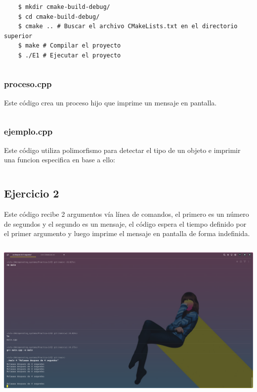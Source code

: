 \documentclass[]{article}
\newenvironment{code}{\captionsetup{type=listing}}{}
\begin{document}
\begin{verbatim}
	$ mkdir cmake-build-debug/
	$ cd cmake-build-debug/
	$ cmake .. # Buscar el archivo CMakeLists.txt en el directorio superior
	$ make # Compilar el proyecto
	$ ./E1 # Ejecutar el proyecto
\end{verbatim}

\begin{code}
	\inputminted{cmake}{../E1/CMakeLists.txt}
\end{code}

\subsubsection*{proceso.cpp}
Este código crea un proceso hijo que imprime un mensaje en pantalla.
\begin{code}
	\inputminted{c}{../E1/proceso.c}
\end{code}


\subsubsection*{ejemplo.cpp}
Este código utiliza polimorfismo para detectar el tipo de un objeto e imprimir
una funcion especifica en base a ello:
\begin{code}
	\inputminted{c}{../E1/ejemplo.cpp}
\end{code}

\subsection{Ejercicio 2}
Este código recibe 2 argumentos vía línea de comandos, el primero es un 
número de segundos y el segundo es un mensaje, el código espera el tiempo
definido por el primer argumento y luego imprime el mensaje en pantalla 
de forma indefinida.
\begin{code}
	\inputminted{cpp}{../E2/main.cpp}
\end{code}

\includegraphics[scale=0.3,trim={0 0 20cm 20cm},clip]{e2-out.png}  
\end{document}
